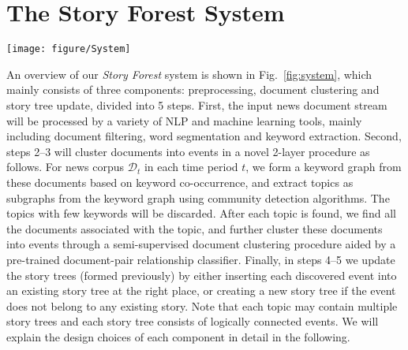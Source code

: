 \section{The Story Forest System}
\label{sec:system}


\begin{figure*}
\texttt{[image: figure/System]}
\caption{An overview of the system architecture of \textit{Story Forest}.}
\label{fig:system}
\vspace{-0mm}
\end{figure*}





An overview of our \textit{Story Forest} system is shown in Fig.~\ref{fig:system}, which mainly consists of three components: preprocessing, document clustering and story tree update, divided into 5 steps. First, the input news document stream will be processed by a variety of NLP and machine learning tools, mainly including document filtering, word segmentation and keyword extraction. Second, steps 2--3 will cluster documents into events in a novel 2-layer procedure as follows.
For news corpus $\mathcal D_t$ in each time period $t$, we form a keyword graph \cite{sayyadi2013graph} from these documents based on keyword co-occurrence, and extract topics as subgraphs from the keyword graph using community detection algorithms. The topics with few keywords will be discarded. After each topic is found, we find all the documents associated with the topic, and further cluster these documents into events through a semi-supervised document clustering procedure aided by a pre-trained document-pair relationship classifier.
Finally, in steps 4--5 we update the story trees (formed previously) by either inserting each discovered event into an existing story tree at the right place, or creating a new story tree if the event does not belong to any existing story. Note that each topic may contain multiple story trees and each story tree consists of logically connected events.
We will explain the design choices of each component in detail in the following.


